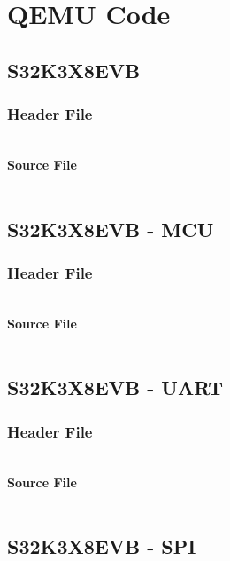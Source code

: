 \chapter{QEMU Code}\label{QEMU_code}

\section{S32K3X8EVB}\label{S32k3X8EVB}
	\subsection{Header File}
	\inputminted[breaklines]{c}{./appendices/files/S32K3X8EVB.h}
	\subsubsection{Source File}
	\inputminted[breaklines]{c}{./appendices/files/S32K3X8EVB.c}

\section{S32K3X8EVB - MCU}\label{S32k3X8EVB_MCU}
	\subsection{Header File}
	\inputminted[breaklines]{c}{./appendices/files/S32K3x8_MCU.h}
	\subsubsection{Source File}
	\inputminted[breaklines]{c}{./appendices/files/S32K3x8_MCU.c}

\section{S32K3X8EVB - UART}\label{S32k3X8EVB_UART}
	\subsection{Header File}
	\inputminted[breaklines]{c}{./appendices/files/S32K_uart.h}
	\subsubsection{Source File}
	\inputminted[breaklines]{c}{./appendices/files/S32K3x8_uart.c}

\section{S32K3X8EVB - SPI}\label{S32k3X8EVB_SPI}
